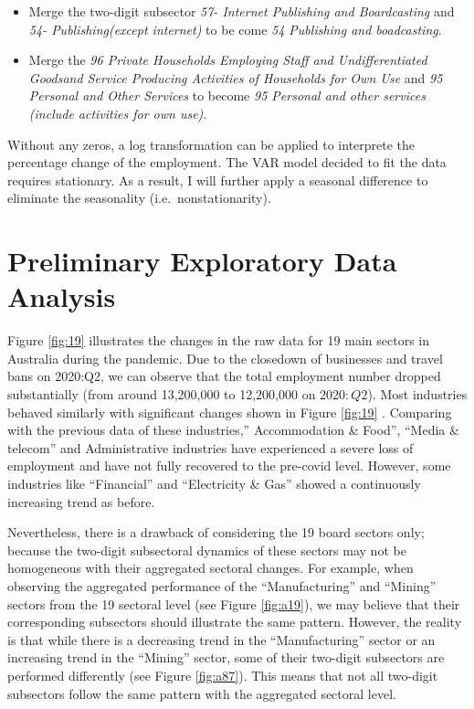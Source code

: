 \documentclass{monashthesis}
\begin{document}
\begin{itemize}
\item
  Merge the two-digit subsector \emph{57- Internet Publishing and Boardcasting} and \emph{54- Publishing(except internet)} to be come \emph{54 Publishing and boadcasting}.
\item
  Merge the \emph{96 Private Households Employing Staff and Undifferentiated Goodsand Service Producing Activities of Households for Own Use} and \emph{95 Personal and Other Services} to become \emph{95 Personal and other services (include activities for own use)}.
\end{itemize}

Without any zeros, a log transformation can be applied to interprete the percentage change of the employment. The VAR model decided to fit the data requires stationary. As a result, I will further apply a seasonal difference to eliminate the seasonality (i.e.~nonstationarity).

\hypertarget{preliminary-exploratory-data-analysis}{%
\section{Preliminary Exploratory Data Analysis}\label{preliminary-exploratory-data-analysis}}

Figure \ref{fig:19} illustrates the changes in the raw data for 19 main sectors in Australia during the pandemic. Due to the closedown of businesses and travel bans on 2020:Q2, we can observe that the total employment number dropped substantially (from around 13,200,000 to 12,200,000 on \(2020:Q2\)). Most industries behaved similarly with significant changes shown in Figure \ref{fig:19} . Comparing with the previous data of these industries,'' Accommodation \& Food'', ``Media \& telecom'' and Administrative industries have experienced a severe loss of employment and have not fully recovered to the pre-covid level. However, some industries like ``Financial'' and ``Electricity \& Gas'' showed a continuously increasing trend as before.

Nevertheless, there is a drawback of considering the 19 board sectors only; because the two-digit subsectoral dynamics of these sectors may not be homogeneous with their aggregated sectoral changes. For example, when observing the aggregated performance of the ``Manufacturing'' and ``Mining'' sectors from the 19 sectoral level (see Figure \ref{fig:a19}), we may believe that their corresponding subsectors should illustrate the same pattern. However, the reality is that while there is a decreasing trend in the ``Manufacturing'' sector or an increasing trend in the ``Mining'' sector, some of their two-digit subsectors are performed differently (see Figure \ref{fig:a87}). This means that not all two-digit subsectors follow the same pattern with the aggregated sectoral level.
\end{document}
